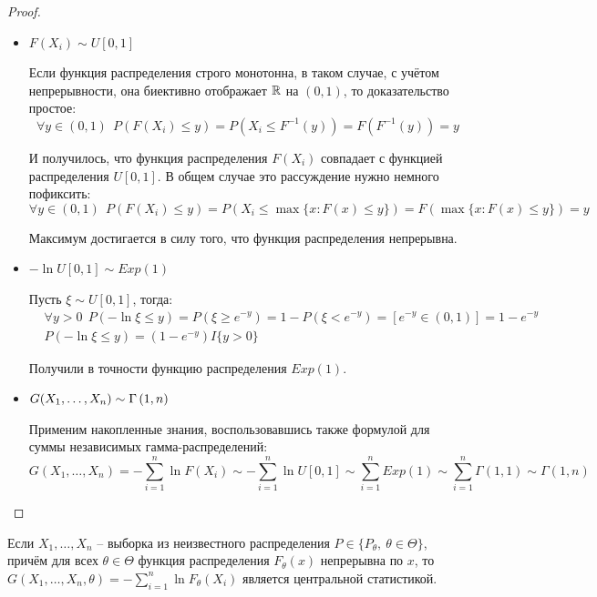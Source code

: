 \begin{proof}~
    \begin{itemize}
        \item $F(X_i) \sim U[0, 1]$

        Если функция распределения строго монотонна, в таком случае, с учётом непрерывности, она биективно отображает $\mathbb{R}$ на $(0, 1)$, то доказательство простое:
        \[
            \forall y \in (0, 1) \ \ P(F(X_i) \le y) = P(X_i \le F^{-1}(y)) = F(F^{-1}(y)) = y
        \]

        И получилось, что функция распределения $F(X_i)$ совпадает с функцией распределения $U[0,1]$. В общем случае это рассуждение нужно немного пофиксить:
        \[
            \forall y \in (0, 1) \ \ P(F(X_i) \le y) = P(X_i \le \max \{x : F(x) \le y\}) = F(\max \{x : F(x) \le y\}) = y
        \]

        Максимум достигается в силу того, что функция распределения непрерывна.

        \item $-\ln U[0, 1] \sim Exp(1)$

        Пусть $\xi \sim U[0, 1]$, тогда:
        \begin{align*}
            & \forall y > 0 \ \ P(-\ln \xi \le y) = P(\xi \ge e^{-y}) = 1 - P(\xi < e^{-y}) = [e^{-y} \in (0, 1)] = 1 - e^{-y}
            \\
            & P(-\ln \xi \le y) = (1 - e^{-y}) I\{y > 0\}
        \end{align*}

        Получили в точности функцию распределения $Exp(1)$.

        \item $G(X_1, \dots, X_n) \sim \Gamma \left(1, n\right)$
        
        Применим накопленные знания, воспользовавшись также формулой для суммы независимых гамма-распределений:
        \[
            G(X_1, \dots, X_n) = -\sum_{i=1}^n \ln F(X_i) \sim -\sum_{i=1}^n \ln U[0, 1] \sim \sum_{i=1}^n Exp(1) \sim \sum_{i=1}^n \Gamma(1, 1) \sim \Gamma(1, n)
        \]
    \end{itemize}
\end{proof}

\begin{corollary}
    Если $X_1, \dots, X_n$ -- выборка из неизвестного распределения $P \in \{P_\theta,\ \theta \in \Theta\}$, причём для всех $\theta \in \Theta$ функция распределения $F_\theta(x)$ непрерывна по $x$, то $G(X_1, \dots, X_n, \theta) = -\sum_{i=1}^n \ln F_\theta(X_i)$ является центральной статистикой.
\end{corollary}

